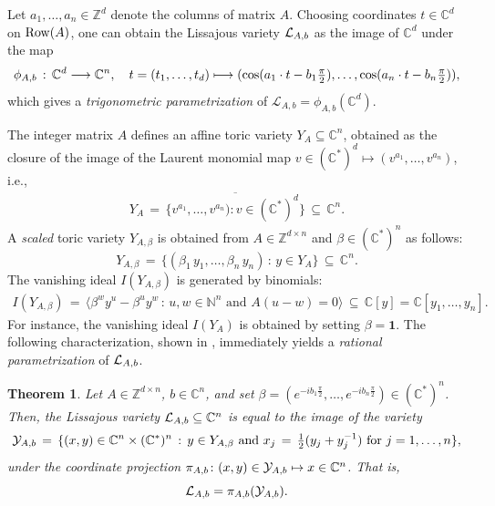 \documentclass[a4paper, 11pt, twoside]{article}
\newcommand{\C}{\mathbb{C}}
\newcommand{\ML}{{\mathcal L}}
\newcommand{\Z}{\mathbb Z}
\newcommand{\one}{{\mathbf 1}}
\theoremstyle{plain}
\newtheorem{theorem}{Theorem}[section]
\begin{document}
Let $a_1,\ldots,a_n\in \Z^d$ denote the columns of matrix $A$. Choosing coordinates $t \in \mathbb{C}^d$ on ${\rm Row}(A)$,  
one can obtain   the Lissajous variety  
${\cal L}_{A,b}$ as   the image  of $\C^d$ under the map
 \begin{equation}\label{eq:parametrization} 
\phi_{A,b} \, : \, \mathbb{C}^d \longrightarrow \mathbb{C}^n, \quad t = (t_1, \ldots, t_d) \longmapsto ( {\rm cos}(a_1 \cdot t - b_1 \tfrac{\pi}{2}), \ldots, {\rm cos}(a_n \cdot t - b_n \tfrac{\pi}{2} )),
\end{equation}
which gives a {\em trigonometric parametrization} of $\ML_{A,b}=\phi_{A,b}(\C^d)$.

The integer matrix $A$ defines an affine toric variety $Y_A \subseteq \mathbb{C}^n$,
 obtained as the closure of the image of the Laurent monomial map $v \in (\mathbb{C}^*)^d\mapsto (v^{a_1}, \ldots, v^{a_n})$,   i.e., 
 \begin{align*}
 Y_A \, = \, \overline{\{v^{a_1},\ldots,v^{a_n}): v\in (\C^*)^d\}} \,  \subseteq \,  \C^n.
 \end{align*}
A \emph{scaled} toric variety $Y_{A,\beta}$ is obtained from $A \in \mathbb{Z}^{d \times n}$ and  $\beta \in (\mathbb{C}^*)^n$ as follows:
\[ Y_{A,\beta} \, = \, \{ (\beta_1 \, y_1, \ldots, \beta_n \, y_n) \, : \,  y \in Y_A \} \, \subseteq \, \mathbb{C}^n. \]
The vanishing ideal $I(Y_{A,\beta})$ is generated by binomials: 
\begin{align}\label{eq:IYA}
 I(Y_{A,\beta}) \, = \, \langle \beta^wy^{u} - \beta^uy^{w} \, : \, u, w \in \mathbb{N}^n \, \, \text{and} \, \,  A(u-w) = 0 \rangle \, \subseteq \, \C[y]=\mathbb{C}[y_1, \ldots, y_n].
 \end{align}
For instance, the vanishing ideal $I(Y_A)$ is obtained by setting  $\beta=\one$. The following characterization, shown in  \cite[Theorem 2.2]{mascarin2025lissajousvarieties}, immediately yields a {\em rational parametrization} of ${\cal L}_{A,b}$.

\begin{theorem}\label{thm:dimension}
Let  $A\in\Z^{d\times n}$, $b\in\C^n$, and set $\beta = (e^{-i b_1 \tfrac{\pi}{2}}, \ldots, e^{-i b_n \tfrac{\pi}{2}}) \in (\mathbb{C}^*)^n$.
Then, the    Lissajous variety ${\cal L}_{A,b} \subseteq \mathbb{C}^n$ is equal to the image of the variety
    \[ {\cal Y}_{A,b} \, = \, \{(x,y) \in \mathbb{C}^n \times (\mathbb{C}^*)^n \, : \, y \in Y_{A,\beta} \text{ and } x_j \, = \, \tfrac{1}{2}(y_j + y_j^{-1}) \text{ for } j = 1, \ldots,n \}, \]
    under the coordinate projection $\pi_{A,b}\colon (x,y)\in {\cal Y}_{A,b}  \mapsto x\in \mathbb{C}^n$. 
      That is, $$\ML_{A,b}=\pi_{A,b}({\cal Y}_{A,b}).$$
\end{theorem}
\end{document}
